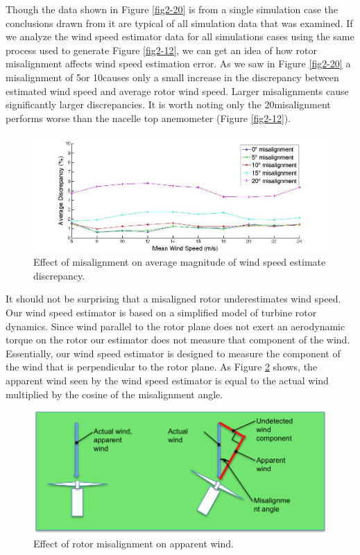 Though the data shown in Figure \ref{fig2-20} is from a single simulation case the conclusions drawn from it are typical of all simulation data that was examined. If we analyze the wind speed estimator data for all simulations cases using the same process used to generate Figure \ref{fig2-12}, we can get an idea of how rotor misalignment affects wind speed estimation error. As we saw in Figure \ref{fig2-20} a misalignment of 5\degree or 10\degree causes only a small increase in the discrepancy between estimated wind speed and average rotor wind speed. Larger misalignments cause significantly larger discrepancies. It is worth noting only the 20\degree misalignment performs worse than the nacelle top anemometer (Figure \ref{fig2-12}).

\begin{figure}[ht]
	\centering
		\includegraphics[width = \linewidth]{Figures/ch2Figures/fig2-21.jpg}
		
	\caption{Effect of misalignment on average magnitude of wind speed estimate discrepancy.}
	\label{fig2-21}
\end{figure}


It should not be surprising that a misaligned rotor underestimates wind speed. Our wind speed estimator is based on a simplified model of turbine rotor dynamics. Since wind parallel to the rotor plane does not exert an aerodynamic torque on the rotor our estimator does not measure that component of the wind. Essentially, our wind speed estimator is designed to measure the component of the wind that is perpendicular to the rotor plane. As Figure \ref{fig2-22} shows, the apparent wind seen by the wind speed estimator is equal to the actual wind multiplied by the cosine of the misalignment angle.

\begin{figure}[htbp]
	\centering
		\includegraphics[width=\textwidth]{Figures/ch2Figures/fig2-22.png}
		
	\caption{Effect of rotor misalignment on apparent wind.}
	\label{fig2-22}
\end{figure}

